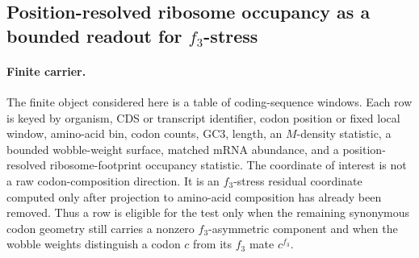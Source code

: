 \subsection{Position-resolved ribosome occupancy as a bounded readout for $f_3$-stress}
\label{sec:q6-f3-stress-position-resolved-ribosome-occupancy-translation-readout}

\paragraph{Finite carrier.}
The finite object considered here is a table of coding-sequence windows.  Each row is keyed by organism, CDS or transcript identifier, codon position or fixed local window, amino-acid bin, codon counts, GC3, length, an $M$-density statistic, a bounded wobble-weight surface, matched mRNA abundance, and a position-resolved ribosome-footprint occupancy statistic.  The coordinate of interest is not a raw codon-composition direction.  It is an $f_3$-stress residual coordinate computed only after projection to amino-acid composition has already been removed.  Thus a row is eligible for the test only when the remaining synonymous codon geometry still carries a nonzero $f_3$-asymmetric component and when the wobble weights distinguish a codon $c$ from its $f_3$ mate $c^{f_3}$.

